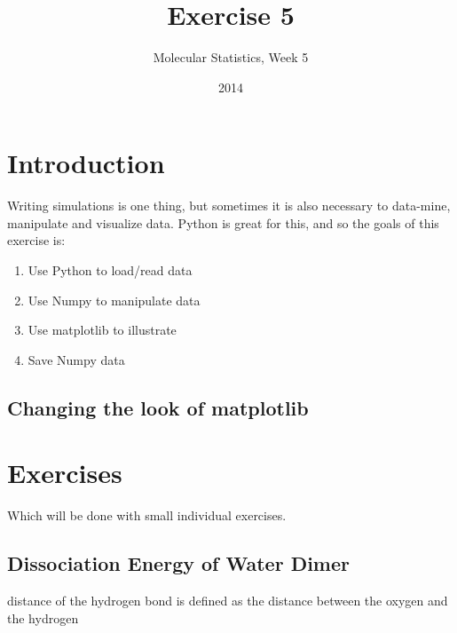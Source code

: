 \documentclass{article}
\title{Exercise 5}
\author{Molecular Statistics, Week 5}
\date{2014}
\begin{document}

\maketitle

\section{Introduction}

Writing simulations is one thing, but sometimes it is also necessary to data-mine, manipulate and visualize data.
Python is great for this, and so the goals of this exercise is:

\begin{enumerate}
    \item Use Python to load/read data

    \item Use Numpy to manipulate data

    \item Use matplotlib to illustrate 

    \item Save Numpy data

\end{enumerate}


\subsection{Changing the look of matplotlib}







\newpage
\section{Exercises}

Which will be done with small individual exercises.

\subsection{Dissociation Energy of Water Dimer}

distance of the hydrogen bond is defined as the distance between the oxygen and the hydrogen
\end{document}
